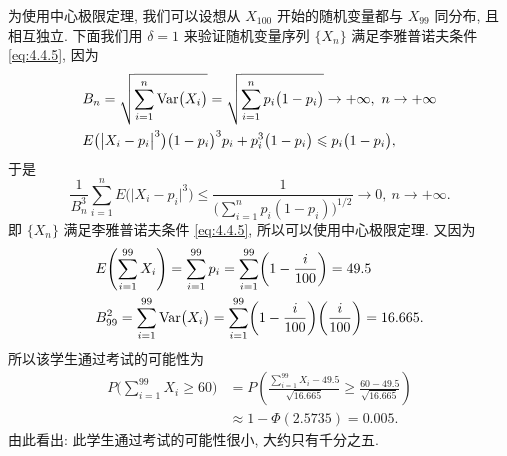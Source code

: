 \begin{solution}
    为使用中心极限定理, 我们可以设想从 $ X_{100} $ 开始的随机变量都与 $ X_{99} $ 同分布, 且相互独立.
    下面我们用 $ \delta = 1 $ 来验证随机变量序列 $ \{ X_n \} $ 满足李雅普诺夫条件 \eqref{eq:4.4.5}, 因为
    \begin{align*}
        & B_n = \sqrt{\sum_{i=1}^n\Var  \bigl( X_i \bigr)} = \sqrt{\sum_{i=1}^n p_i \bigl( 1 - p_i \bigr)} \to +\infty, \ n \to +\infty\\
        & E \bigl( \bigl\lvert X_i - p_i \bigr\rvert^3 \bigr) \bigl( 1 - p_i \bigr)^3 p_i + p_i^3 \bigl( 1 - p_i \bigr) \leq p_i \bigl( 1 - p_i \bigr),
    \end{align*}
    于是
    \begin{equation*}
        \frac{1}{B_n^3} \sum_{i=1}^n E \bigl( \bigl\lvert X_i - p_i \bigr\rvert^3 \bigr) \leq \frac{1}{\bigl( \sum_{i=1}^n p_i ( 1 - p_i ) \bigr)^{1/2}} \to 0, \ n \to +\infty.
    \end{equation*}
    即 $ \{ X_n \} $ 满足李雅普诺夫条件 \eqref{eq:4.4.5}, 所以可以使用中心极限定理.
    又因为
    \begin{align*}
        & E \Biggl( \sum_{i=1}^{99} X_i \Biggr) = \sum_{i=1}^{99} p_i = \sum_{i=1}^{99} \biggl( 1 - \frac{i}{100} \biggr) = 49.5\\
        & B_{99}^2 = \sum_{i=1}^{99}\operatorname{Var}  \bigl( X_i \bigr) = \sum_{i=1}^{99} \biggl( 1 - \frac{i}{100} \biggr) \biggl( \frac{i}{100} \biggr) = 16.665.
    \end{align*}
    所以该学生通过考试的可能性为
    \begin{align*}
        P \Biggl( \sum_{i=1}^{99} X_i \geq 60 \Biggr) & = P \left( \frac{\sum_{i=1}^{99} X_i - 49.5}{\sqrt{16.665}} \geq \frac{60-49.5}{\sqrt{16.665}} \right)\\
        & \approx 1 - \Phi (2.5735) = 0.005.
    \end{align*}
    由此看出: 此学生通过考试的可能性很小, 大约只有千分之五.
\end{solution}

